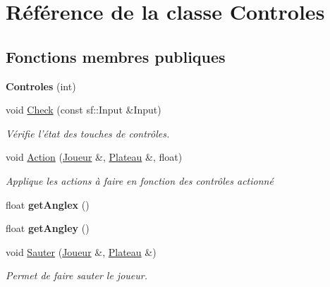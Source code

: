 \hypertarget{classControles}{\section{Référence de la classe Controles}
\label{classControles}
}
\subsection*{Fonctions membres publiques}
\begin{DoxyCompactItemize}
\item 
\hypertarget{classControles_a85c346918567b55c260ece35d75f3ce8}{{\bfseries Controles} (int)}\label{classControles_a85c346918567b55c260ece35d75f3ce8}

\item 
\hypertarget{classControles_a1cf794967c60914ef9ad22f61bad2525}{void \hyperlink{classControles_a1cf794967c60914ef9ad22f61bad2525}{Check} (const sf\-::\-Input \&Input)}\label{classControles_a1cf794967c60914ef9ad22f61bad2525}

\begin{DoxyCompactList}\small\item\em Vérifie l'état des touches de contrôles. \end{DoxyCompactList}\item 
\hypertarget{classControles_a570494eca52fa3194d52d04f79d1ca17}{void \hyperlink{classControles_a570494eca52fa3194d52d04f79d1ca17}{Action} (\hyperlink{classJoueur}{Joueur} \&, \hyperlink{classPlateau}{Plateau} \&, float)}\label{classControles_a570494eca52fa3194d52d04f79d1ca17}

\begin{DoxyCompactList}\small\item\em Applique les actions à faire en fonction des contrôles actionné \end{DoxyCompactList}\item 
\hypertarget{classControles_a8e3d0dc550191ba752203885a6f848fe}{float {\bfseries get\-Anglex} ()}\label{classControles_a8e3d0dc550191ba752203885a6f848fe}

\item 
\hypertarget{classControles_ab22968993b4f4b136c58c7276395f773}{float {\bfseries get\-Angley} ()}\label{classControles_ab22968993b4f4b136c58c7276395f773}

\item 
\hypertarget{classControles_adfcb548e36751cf333c8f465a688e7d9}{void \hyperlink{classControles_adfcb548e36751cf333c8f465a688e7d9}{Sauter} (\hyperlink{classJoueur}{Joueur} \&, \hyperlink{classPlateau}{Plateau} \&)}\label{classControles_adfcb548e36751cf333c8f465a688e7d9}

\begin{DoxyCompactList}\small\item\em Permet de faire sauter le joueur. \end{DoxyCompactList}\end{DoxyCompactItemize}
